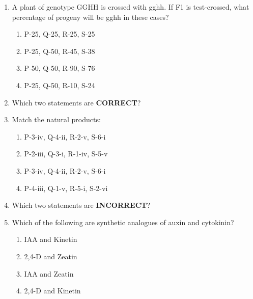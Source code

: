 \documentclass[journal]{IEEEtran}
\begin{document}
\begin{enumerate}
\item A plant of genotype GGHH is crossed with gghh. If F1 is test-crossed, what percentage of progeny will be gghh in these cases?\hfill  \textit{}
\begin{enumerate}
    \item P-25, Q-25, R-25, S-25
    \item P-25, Q-50, R-45, S-38
    \item P-50, Q-50, R-90, S-76
    \item P-25, Q-50, R-10, S-24
\end{enumerate}

\item Which two statements are \textbf{CORRECT}?\hfill  \textit{}
\begin{enumerate}
\end{enumerate}

\item Match the natural products:\hfill  \textit{}
\begin{enumerate}
    \item P-3-iv, Q-4-ii, R-2-v, S-6-i
    \item P-2-iii, Q-3-i, R-1-iv, S-5-v
    \item P-3-iv, Q-4-ii, R-2-v, S-6-i
    \item P-4-iii, Q-1-v, R-5-i, S-2-vi
\end{enumerate}

\item Which two statements are \textbf{INCORRECT}?\hfill  \textit{}
\begin{enumerate}
\end{enumerate}

\item Which of the following are synthetic analogues of auxin and cytokinin?\hfill  \textit{}
\begin{enumerate}
    \item IAA and Kinetin
    \item 2,4-D and Zeatin
    \item IAA and Zeatin
    \item 2,4-D and Kinetin
\end{enumerate}


\end{enumerate}
\end{document}
